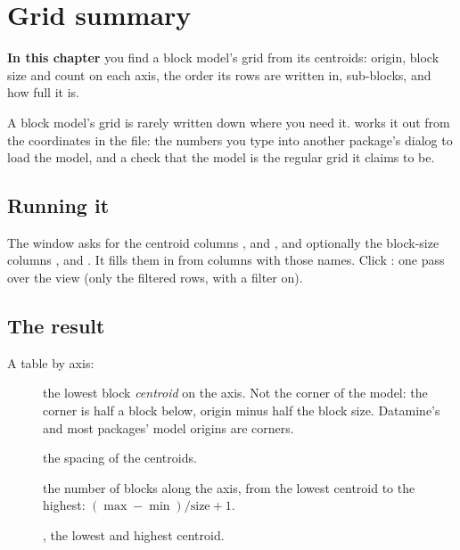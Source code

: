 \chapter{Grid summary}\label{ch:gridsum}
\begin{goals}
\textbf{In this chapter} you find a block model's grid from its centroids: origin, block size and count
on each axis, the order its rows are written in, sub-blocks, and how full it is.
\end{goals}

A block model's grid is rarely written down where you need it.  works it out
from the coordinates in the file: the numbers you type into another package's dialog to load the model,
and a check that the model is the regular grid it claims to be.

\section{Running it}

The window asks for the centroid columns ,  and , and optionally the block-size columns
,  and . It fills them in from columns with those names. Click :
one pass over the view (only the filtered rows, with a filter on).


\section{The result}\label{sec:gridsum-result}

A table by axis:

\begin{description}
\item[] the lowest block \emph{centroid} on the axis. Not the corner of the model: the corner is
half a block below, origin minus half the block size. Datamine's  and most packages' model
origins are corners.
\item[] the spacing of the centroids.
\item[] the number of blocks along the axis, from the lowest centroid to the highest:
$(\max - \min)/\mathrm{size} + 1$.
\item[],  the lowest and highest centroid.
\end{description}

